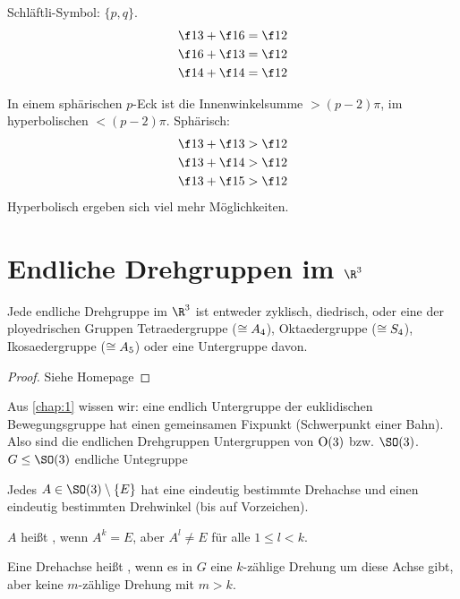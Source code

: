 Schläftli-Symbol: $\{p, q\}$.
\begin{align*}
	\f 13 + \f 16 &= \f 12 \\
	\f 16 + \f 13 &= \f 12 \\
	\f 14 + \f 14 &= \f 12
\end{align*}

In einem sphärischen $p$-Eck ist die Innenwinkelsumme $> (p-2) \pi$, im hyperbolischen $< (p-2)\pi$.
Sphärisch:
\begin{align*}
	\f 13 + \f 13 &> \f 12 \\
	\f 13 + \f 14 &> \f 12 \\
	\f 13 + \f 15 &> \f 12
\end{align*}
Hyperbolisch ergeben sich viel mehr Möglichkeiten.


\section{Endliche Drehgruppen im \texorpdfstring{$\R^3$}{ℝ³}}


\begin{st}
	Jede endliche Drehgruppe im $\R^3$ ist entweder zyklisch, diedrisch, oder eine der ployedrischen Gruppen Tetraedergruppe ($\cong A_4$), Oktaedergruppe ($\cong S_4$), Ikosaedergruppe ($\cong A_5$) oder eine Untergruppe davon.
	\begin{proof}
		Siehe Homepage
	\end{proof}
\end{st}

\begin{nt}
	Aus \ref{chap:1} wissen wir: eine endlich Untergruppe der euklidischen Bewegungsgruppe hat einen gemeinsamen Fixpunkt (Schwerpunkt einer Bahn).
	Also sind die endlichen Drehgruppen Untergruppen von $\operatorname{O}(3)$ bzw. $\SO(3)$.
	$G \le \SO(3)$ endliche Untegruppe

	Jedes $A \in \SO(3) \setminus \{E\}$ hat eine eindeutig bestimmte Drehachse und einen eindeutig bestimmten Drehwinkel (bis auf Vorzeichen).
\end{nt}

\begin{df}
	$A$ heißt , wenn $A^k = E$, aber $A^l \neq E$ für alle $1 \le l < k$.

	Eine Drehachse heißt , wenn es in $G$ eine $k$-zählige Drehung um diese Achse gibt, aber keine $m$-zählige Drehung mit $m > k$.
\end{df}


